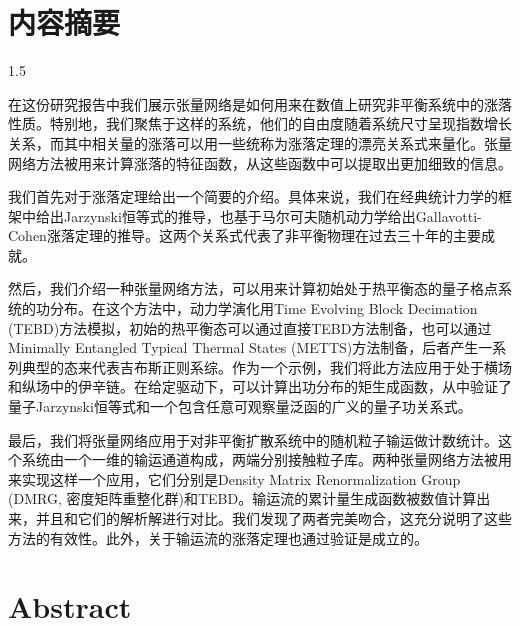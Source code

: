 \chapter{内容摘要}


\begin{spacing}{1.5} %
\par 在这份研究报告中我们展示张量网络是如何用来在数值上研究非平衡系统中的涨落性质。特别地，我们聚焦于这样的系统，他们的自由度随着系统尺寸呈现指数增长关系，而其中相关量的涨落可以用一些统称为涨落定理的漂亮关系式来量化。张量网络方法被用来计算涨落的特征函数，从这些函数中可以提取出更加细致的信息。 

\par 我们首先对于涨落定理给出一个简要的介绍。具体来说，我们在经典统计力学的框架中给出Jarzynski恒等式的推导，也基于马尔可夫随机动力学给出Gallavotti-Cohen涨落定理的推导。这两个关系式代表了非平衡物理在过去三十年的主要成就。

\par 然后，我们介绍一种张量网络方法，可以用来计算初始处于热平衡态的量子格点系统的功分布。在这个方法中，动力学演化用Time Evolving Block Decimation (TEBD)方法模拟，初始的热平衡态可以通过直接TEBD方法制备，也可以通过Minimally Entangled Typical Thermal States (METTS)方法制备，后者产生一系列典型的态来代表吉布斯正则系综。作为一个示例，我们将此方法应用于处于横场和纵场中的伊辛链。在给定驱动下，可以计算出功分布的矩生成函数，从中验证了量子Jarzynski恒等式和一个包含任意可观察量泛函的广义的量子功关系式。

\par 最后，我们将张量网络应用于对非平衡扩散系统中的随机粒子输运做计数统计。这个系统由一个一维的输运通道构成，两端分别接触粒子库。两种张量网络方法被用来实现这样一个应用，它们分别是Density Matrix Renormalization Group (DMRG, 密度矩阵重整化群)和TEBD。输运流的累计量生成函数被数值计算出来，并且和它们的解析解进行对比。我们发现了两者完美吻合，这充分说明了这些方法的有效性。此外，关于输运流的涨落定理也通过验证是成立的。
\end{spacing}
\vspace{5mm}







\chapter{Abstract}

